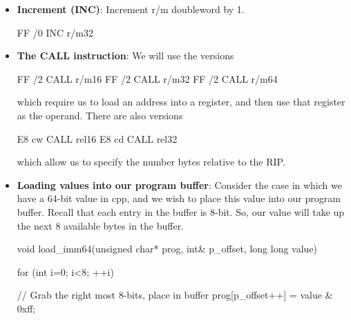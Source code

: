 \documentclass{report}
\begin{document}
\begin{itemize}
\begin{itemize}
\begin{cppcode}
                    D1 /5 SHR r/m32, 1
                    \end{cppcode}
            \end{itemize}
        \item \textbf{Increment (INC)}:  Increment r/m doubleword by 1.
            \bigbreak \noindent 
            \begin{cppcode}
                FF /0 INC r/m32
            \end{cppcode}
        \item \textbf{The CALL instruction}: We will use the versions
            \bigbreak \noindent 
            \begin{cppcode}
            FF /2 CALL r/m16
            FF /2 CALL r/m32
            FF /2 CALL r/m64
            \end{cppcode}
            \bigbreak \noindent 
            which require us to load an address into a register, and then use that register as the operand. There are also versions
            \bigbreak \noindent 
            \begin{cppcode}
            E8 cw CALL rel16
            E8 cd CALL rel32
            \end{cppcode} 
            \bigbreak \noindent 
            which allow us to specify the number bytes relative to the RIP.
        \item \textbf{Loading values into our program buffer}: Consider the case in which we have a 64-bit value in cpp, and we wish to place this value into our program buffer. Recall that each entry in the buffer is 8-bit. So, our value will take up the next 8 available bytes in the buffer.
            \bigbreak \noindent 
            \begin{cppcode}
                void load_imm64(unsigned char* prog, int& p_offset, long long value) {
                    for (int i=0; i<8; ++i) {
                        // Grab the right most 8-bits, place in buffer
                        prog[p_offset++] = value & 0xff;

}}
\end{cppcode}
\end{itemize}
\end{document}
